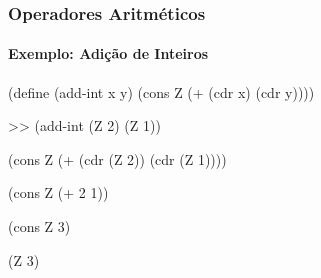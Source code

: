 \begin{frame}[fragile]
  \frametitle{Operadores Aritméticos}
  \framesubtitle{Exemplo: Adição de Inteiros}
  \begin{minipage}{0.47\textwidth}
  \begin{code}
(define (add-int x y)
  (cons Z (+ (cdr x)
             (cdr y))))
  \end{code}
  \end{minipage}
  \pause
  \hfill
  \begin{minipage}{0.47\textwidth}

  \vspace{0.5cm}
  \begin{code}
>> (add-int (Z 2) (Z 1))
  \end{code}
  \pause
  \vspace{0.07cm}
  \begin{code}
(cons Z (+ (cdr (Z 2))
           (cdr (Z 1))))
  \end{code}

  \pause
  \vspace{0.07cm}
  \begin{code}
(cons Z (+ 2 1))
  \end{code}

  \pause
  \vspace{0.07cm}
  \begin{code}
(cons Z 3)
  \end{code}

  \pause
  \vspace{0.07cm}
  \begin{code}
(Z 3)
  \end{code}
  \end{minipage}
\end{frame}



